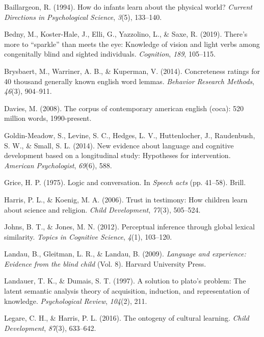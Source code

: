 \documentclass[10pt, letterpaper]{article}
\begin{document}
\leavevmode\hypertarget{ref-baillargeon1994}{}%
Baillargeon, R. (1994). How do infants learn about the physical world?
\emph{Current Directions in Psychological Science}, \emph{3}(5),
133--140.

\leavevmode\hypertarget{ref-bedny2019}{}%
Bedny, M., Koster-Hale, J., Elli, G., Yazzolino, L., \& Saxe, R. (2019).
There's more to ``sparkle'' than meets the eye: Knowledge of vision and
light verbs among congenitally blind and sighted individuals.
\emph{Cognition}, \emph{189}, 105--115.

\leavevmode\hypertarget{ref-brysbaert2014}{}%
Brysbaert, M., Warriner, A. B., \& Kuperman, V. (2014). Concreteness
ratings for 40 thousand generally known english word lemmas.
\emph{Behavior Research Methods}, \emph{46}(3), 904--911.

\leavevmode\hypertarget{ref-davies2008}{}%
Davies, M. (2008). The corpus of contemporary american english (coca):
520 million words, 1990-present.

\leavevmode\hypertarget{ref-goldin-meadow2014}{}%
Goldin-Meadow, S., Levine, S. C., Hedges, L. V., Huttenlocher, J.,
Raudenbush, S. W., \& Small, S. L. (2014). New evidence about language
and cognitive development based on a longitudinal study: Hypotheses for
intervention. \emph{American Psychologist}, \emph{69}(6), 588.

\leavevmode\hypertarget{ref-grice1975}{}%
Grice, H. P. (1975). Logic and conversation. In \emph{Speech acts} (pp.
41--58). Brill.

\leavevmode\hypertarget{ref-harris2006}{}%
Harris, P. L., \& Koenig, M. A. (2006). Trust in testimony: How children
learn about science and religion. \emph{Child Development},
\emph{77}(3), 505--524.

\leavevmode\hypertarget{ref-johns2012}{}%
Johns, B. T., \& Jones, M. N. (2012). Perceptual inference through
global lexical similarity. \emph{Topics in Cognitive Science},
\emph{4}(1), 103--120.

\leavevmode\hypertarget{ref-landau2009}{}%
Landau, B., Gleitman, L. R., \& Landau, B. (2009). \emph{Language and
experience: Evidence from the blind child} (Vol. 8). Harvard University
Press.

\leavevmode\hypertarget{ref-landauer1997}{}%
Landauer, T. K., \& Dumais, S. T. (1997). A solution to plato's problem:
The latent semantic analysis theory of acquisition, induction, and
representation of knowledge. \emph{Psychological Review}, \emph{104}(2),
211.

\leavevmode\hypertarget{ref-legare2016}{}%
Legare, C. H., \& Harris, P. L. (2016). The ontogeny of cultural
learning. \emph{Child Development}, \emph{87}(3), 633--642.
\end{document}
